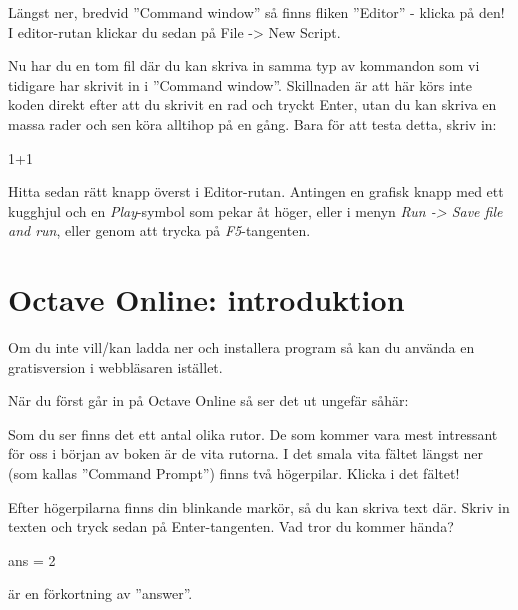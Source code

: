 Längst ner, bredvid ''Command window'' så finns fliken ''Editor'' - klicka på den! I editor-rutan klickar du sedan på File -> New Script.

Nu har du en tom fil där du kan skriva in samma typ av kommandon som vi tidigare har skrivit in i ''Command window''. Skillnaden är att här körs inte koden direkt efter att du skrivit en rad och tryckt Enter, utan du kan skriva en massa rader och sen köra alltihop på en gång. Bara för att testa detta, skriv in:

\begin{matlab}[caption={Skrivit in lite matte},label={}]
1+1
\end{matlab}

Hitta sedan rätt knapp överst i Editor-rutan. Antingen en grafisk knapp med ett kugghjul och en \emph{Play}-symbol som pekar åt höger, eller i menyn \emph{Run -> Save file and run}, eller genom att trycka på \emph{F5}-tangenten.

\newpage

\section{Octave Online: introduktion}
Om du inte vill/kan ladda ner och installera program så kan du använda en gratisversion i webbläsaren istället.


När du först går in på Octave Online så ser det ut ungefär såhär:


Som du ser finns det ett antal olika rutor. De som kommer vara mest intressant för oss i början av boken är de vita rutorna. I det smala vita fältet längst ner (som kallas ''Command Prompt'') finns två högerpilar. Klicka i det fältet!

Efter högerpilarna finns din blinkande markör, så du kan skriva text där. Skriv in texten  och tryck sedan på Enter-tangenten. Vad tror du kommer hända?

\begin{matlab}[caption={Hurra, datorn kan räkna!},label={}]
ans = 2
\end{matlab}

 är en förkortning av ''answer''.
\newpage

